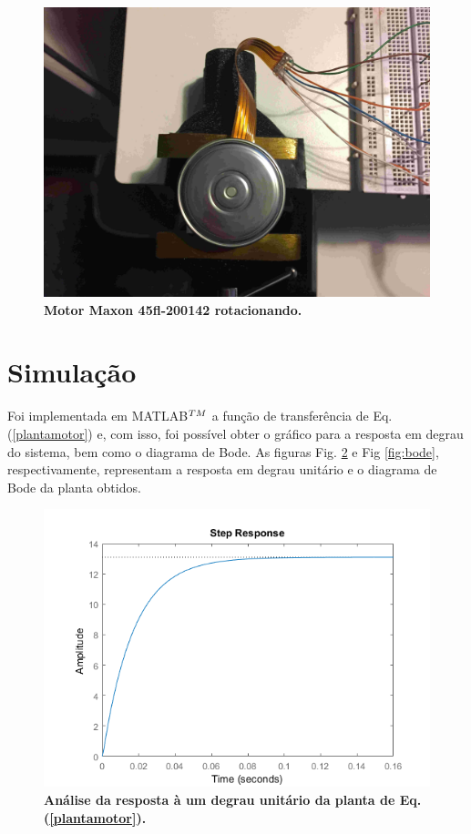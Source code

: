 \documentclass[10pt,fleqn,a4paper]{article}
\begin{document}
	\begin{figure}[ht]
		\begin{center}
			\includegraphics[angle=0, scale=0.06]{images/motornovo}
		\end{center}
		\caption{\textbf{Motor Maxon 45fl-200142 rotacionando.}}
		\label{fig:motornovo}
	\end{figure}

	\newpage
    
    \section{Simulação}
    
    Foi implementada em MATLAB$^{\small{TM}}$ a função de transferência de Eq. (\ref{plantamotor}) e, com isso, foi possível obter o gráfico para a resposta em degrau do sistema, bem como o diagrama de Bode. As figuras Fig. \ref{fig:respostaemdegrau} e Fig \ref{fig:bode}, respectivamente, representam a resposta em degrau unitário e o diagrama de Bode da planta obtidos.

	\begin{figure}[ht]
		\begin{center}
			\includegraphics[angle=0, scale=0.7]{images/stepResponse}
		\end{center}
		\caption{\textbf{Análise da resposta à um degrau unitário da planta de Eq. (\ref{plantamotor}).}}
		\label{fig:respostaemdegrau}
	\end{figure}
\end{document}

